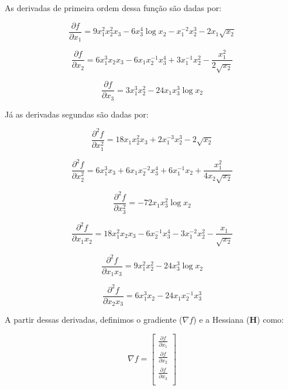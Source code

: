 \documentclass[10pt, a4paper]{article}
\begin{document}
As derivadas de primeira ordem dessa função são dadas por:

\begin{equation}
    \frac{\partial f}{\partial x_1} = 9x_1^2x_2^2x_3 - 6x_3^4\log{x_2} - x_1^{-2}x_2^3 - 2x_1\sqrt{x_2}
\end{equation}

\begin{equation}
    \frac{\partial f}{\partial x_2} = 6x_1^3x_2x_3 - 6x_1x_2^{-1}x_3^4 + 3x_1^{-1}x_2^2 - \frac{x_1^2}{2\sqrt{x_2}}
\end{equation}

\begin{equation}
    \frac{\partial f}{\partial x_3} = 3x_1^3x_2^2 - 24x_1x_3^3\log{x_2}
\end{equation}

Já as derivadas segundas são dadas por:

\begin{equation}
    \frac{\partial^2 f}{\partial x_1^2} = 18x_1x_2^2x_3 + 2x_1^{-3}x_2^3 - 2\sqrt{x_2}
\end{equation}

\begin{equation}
    \frac{\partial^2 f}{\partial x_2^2} = 6x_1^3x_3 + 6x_1x_2^{-2}x_3^4 + 6x_1^{-1}x_2 + \frac{x_1^2}{4x_2\sqrt{x_2}}
\end{equation}

\begin{equation}
    \frac{\partial^2 f}{\partial x_3^2} = - 72x_1x_3^2\log{x_2}
\end{equation}

\begin{equation}
    \frac{\partial^2 f}{\partial x_1x_2} = 18x_1^2x_2x_3 - 6x_2^{-1}x_3^4 - 3x_1^{-2}x_2^2 - \frac{x_1}{\sqrt{x_2}}
\end{equation}

\begin{equation}
    \frac{\partial^2 f}{\partial x_1x_3} = 9x_1^2x_2^2 - 24x_3^3\log{x_2}
\end{equation}

\begin{equation}
    \frac{\partial^2 f}{\partial x_2x_3} = 6x_1^3x_2 - 24x_1x_2^{-1}x_3^3
\end{equation}

A partir dessas derivadas, definimos o gradiente ($\nabla f$) e a Hessiana ($\mathbf{H}$) como:

\[
  \nabla f =
  \left[ {\begin{array}{c}
    \frac{\partial f}{\partial x_1} \\
    \frac{\partial f}{\partial x_2} \\
    \frac{\partial f}{\partial x_3} \\
  \end{array} } \right]
  \]
\end{document}
